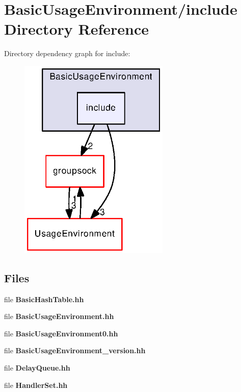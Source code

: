 \section{Basic\+Usage\+Environment/include Directory Reference}
\label{dir_5abb0c41b90be31abe21b8330a419947}
Directory dependency graph for include\+:
\nopagebreak
\begin{figure}[H]
\begin{center}
\leavevmode
\includegraphics[width=203pt]{dir_5abb0c41b90be31abe21b8330a419947_dep}
\end{center}
\end{figure}
\subsection*{Files}
\begin{DoxyCompactItemize}
\item 
file {\bf Basic\+Hash\+Table.\+hh}
\item 
file {\bf Basic\+Usage\+Environment.\+hh}
\item 
file {\bf Basic\+Usage\+Environment0.\+hh}
\item 
file {\bf Basic\+Usage\+Environment\+\_\+version.\+hh}
\item 
file {\bf Delay\+Queue.\+hh}
\item 
file {\bf Handler\+Set.\+hh}
\end{DoxyCompactItemize}
